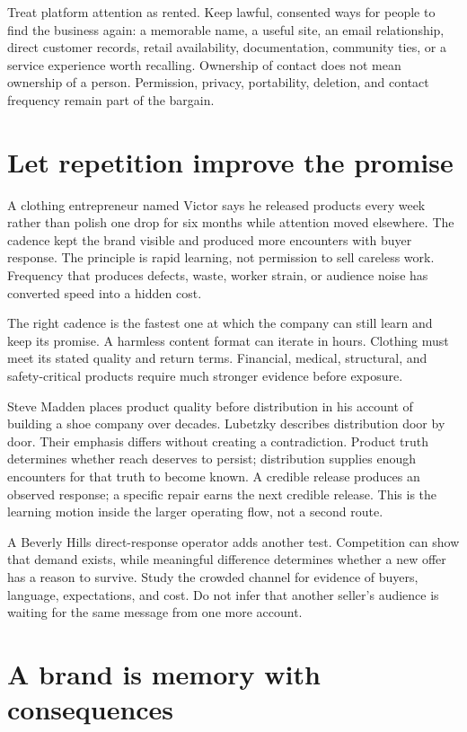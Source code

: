 Treat platform attention as rented. Keep lawful, consented ways for people to
find the business again: a memorable name, a useful site, an email relationship,
direct customer records, retail availability, documentation, community ties,
or a service experience worth recalling. Ownership of contact does not mean
ownership of a person. Permission, privacy, portability, deletion, and contact
frequency remain part of the bargain.

\section{Let repetition improve the promise}

A clothing entrepreneur named Victor says he released products every week
rather than polish one drop for six months while attention moved elsewhere.
The cadence kept the brand visible and produced more encounters with buyer
response. The principle is rapid learning, not permission to sell careless
work. Frequency that produces defects, waste, worker strain, or audience noise
has converted speed into a hidden cost.

The right cadence is the fastest one at which the company can still learn and
keep its promise. A harmless content format can iterate in hours. Clothing must
meet its stated quality and return terms. Financial, medical, structural, and
safety-critical products require much stronger evidence before exposure.

Steve Madden places product quality before distribution in his account of
building a shoe company over decades. Lubetzky describes distribution door by
door. Their emphasis differs without creating a contradiction. Product truth
determines whether reach deserves to persist; distribution supplies enough
encounters for that truth to become known. A credible release produces an
observed response; a specific repair earns the next credible release. This is
the learning motion inside the larger operating flow, not a second route.

A Beverly Hills direct-response operator adds another test. Competition can
show that demand exists, while meaningful difference determines whether a new
offer has a reason to survive. Study the crowded channel for evidence of
buyers, language, expectations, and cost. Do not infer that another seller's
audience is waiting for the same message from one more account.

\section{A brand is memory with consequences}

